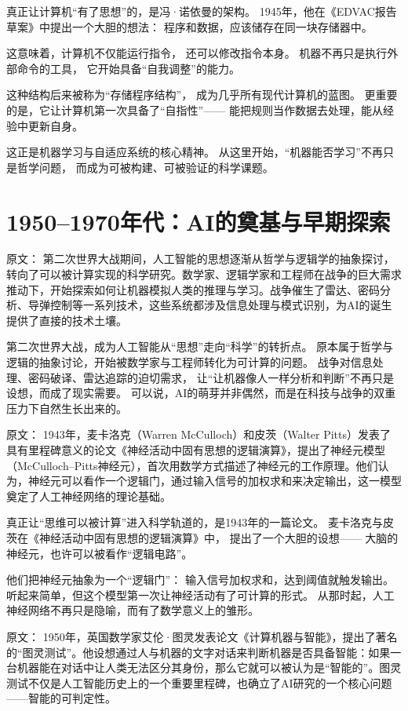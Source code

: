 真正让计算机“有了思想”的，是冯·诺依曼的架构。
1945年，他在《EDVAC报告草案》中提出一个大胆的想法：
程序和数据，应该储存在同一块存储器中。

这意味着，计算机不仅能运行指令，
还可以修改指令本身。
机器不再只是执行外部命令的工具，
它开始具备“自我调整”的能力。

这种结构后来被称为“存储程序结构”，
成为几乎所有现代计算机的蓝图。
更重要的是，它让计算机第一次具备了“自指性”——
能把规则当作数据去处理，能从经验中更新自身。

这正是机器学习与自适应系统的核心精神。
从这里开始，“机器能否学习”不再只是哲学问题，
而成为可被构建、可被验证的科学课题。

\section{1950–1970年代：AI的奠基与早期探索}

原文：
第二次世界大战期间，人工智能的思想逐渐从哲学与逻辑学的抽象探讨，转向了可以被计算实现的科学研究。数学家、逻辑学家和工程师在战争的巨大需求推动下，开始探索如何让机器模拟人类的推理与学习。战争催生了雷达、密码分析、导弹控制等一系列技术，这些系统都涉及信息处理与模式识别，为AI的诞生提供了直接的技术土壤。

第二次世界大战，成为人工智能从“思想”走向“科学”的转折点。
原本属于哲学与逻辑的抽象讨论，开始被数学家与工程师转化为可计算的问题。
战争对信息处理、密码破译、雷达追踪的迫切需求，
让“让机器像人一样分析和判断”不再只是设想，而成了现实需要。
可以说，AI的萌芽并非偶然，而是在科技与战争的双重压力下自然生长出来的。

原文：
1943年，麦卡洛克（Warren McCulloch）和皮茨（Walter Pitts）发表了具有里程碑意义的论文《神经活动中固有思想的逻辑演算》，提出了神经元模型（McCulloch–Pitts神经元），首次用数学方式描述了神经元的工作原理。他们认为，神经元可以看作一个逻辑门，通过输入信号的加权求和来决定输出，这一模型奠定了人工神经网络的理论基础。

真正让“思维可以被计算”进入科学轨道的，是1943年的一篇论文。
麦卡洛克与皮茨在《神经活动中固有思想的逻辑演算》中，
提出了一个大胆的设想——
大脑的神经元，也许可以被看作“逻辑电路”。

他们把神经元抽象为一个“逻辑门”：
输入信号加权求和，达到阈值就触发输出。
听起来简单，但这个模型第一次让神经活动有了可计算的形式。
从那时起，人工神经网络不再只是隐喻，而有了数学意义上的雏形。

原文：
1950年，英国数学家艾伦·图灵发表论文《计算机器与智能》，提出了著名的“图灵测试”。他设想通过人与机器的文字对话来判断机器是否具备智能：如果一台机器能在对话中让人类无法区分其身份，那么它就可以被认为是“智能的”。图灵测试不仅是人工智能历史上的一个重要里程碑，也确立了AI研究的一个核心问题——智能的可判定性。

